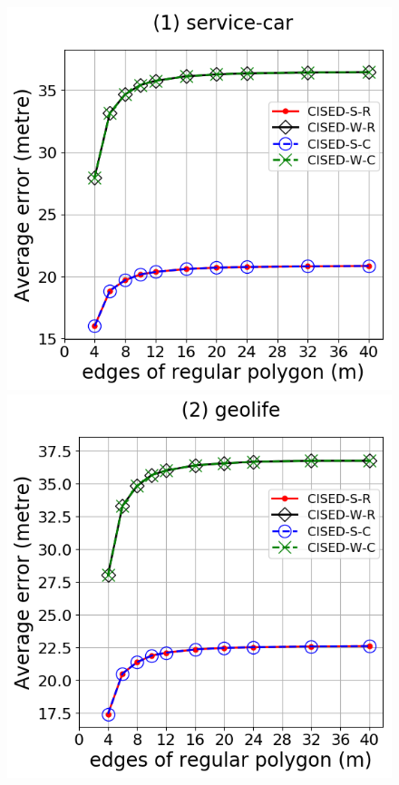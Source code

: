 {\begin{figure}[tb!]
	\centering
	\includegraphics[scale = 0.2750]{Figures/Exp-M-e-60-error-service.png}\hspace{3ex}
	\includegraphics[scale = 0.2750]{Figures/Exp-M-e-60-error-geolife.png}\hspace{3ex}

\end{figure}}
